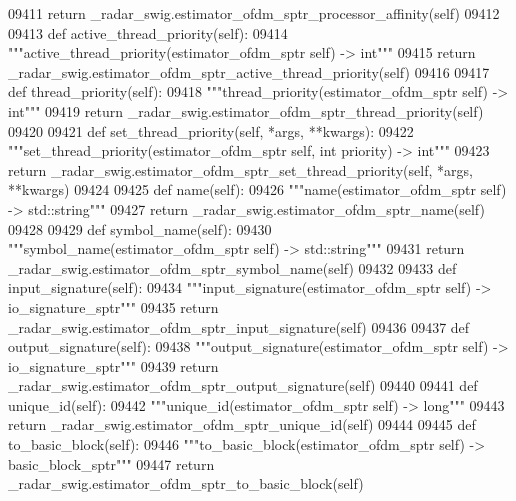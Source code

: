 \begin{DoxyCode}
{{{{{{{{{{{{{{{{{{{{{{{{{{{{{{09411         \textcolor{keywordflow}{return} \_radar\_swig.estimator\_ofdm\_sptr\_processor\_affinity(self)
09412 
09413     \textcolor{keyword}{def }active_thread_priority(self):
09414         \textcolor{stringliteral}{"""active\_thread\_priority(estimator\_ofdm\_sptr self) -> int"""}
09415         \textcolor{keywordflow}{return} \_radar\_swig.estimator\_ofdm\_sptr\_active\_thread\_priority(self)
09416 
09417     \textcolor{keyword}{def }thread_priority(self):
09418         \textcolor{stringliteral}{"""thread\_priority(estimator\_ofdm\_sptr self) -> int"""}
09419         \textcolor{keywordflow}{return} \_radar\_swig.estimator\_ofdm\_sptr\_thread\_priority(self)
09420 
09421     \textcolor{keyword}{def }set_thread_priority(self, *args, **kwargs):
09422         \textcolor{stringliteral}{"""set\_thread\_priority(estimator\_ofdm\_sptr self, int priority) -> int"""}
09423         \textcolor{keywordflow}{return} \_radar\_swig.estimator\_ofdm\_sptr\_set\_thread\_priority(self, *args, **kwargs)
09424 
09425     \textcolor{keyword}{def }name(self):
09426         \textcolor{stringliteral}{"""name(estimator\_ofdm\_sptr self) -> std::string"""}
09427         \textcolor{keywordflow}{return} \_radar\_swig.estimator\_ofdm\_sptr\_name(self)
09428 
09429     \textcolor{keyword}{def }symbol_name(self):
09430         \textcolor{stringliteral}{"""symbol\_name(estimator\_ofdm\_sptr self) -> std::string"""}
09431         \textcolor{keywordflow}{return} \_radar\_swig.estimator\_ofdm\_sptr\_symbol\_name(self)
09432 
09433     \textcolor{keyword}{def }input_signature(self):
09434         \textcolor{stringliteral}{"""input\_signature(estimator\_ofdm\_sptr self) -> io\_signature\_sptr"""}
09435         \textcolor{keywordflow}{return} \_radar\_swig.estimator\_ofdm\_sptr\_input\_signature(self)
09436 
09437     \textcolor{keyword}{def }output_signature(self):
09438         \textcolor{stringliteral}{"""output\_signature(estimator\_ofdm\_sptr self) -> io\_signature\_sptr"""}
09439         \textcolor{keywordflow}{return} \_radar\_swig.estimator\_ofdm\_sptr\_output\_signature(self)
09440 
09441     \textcolor{keyword}{def }unique_id(self):
09442         \textcolor{stringliteral}{"""unique\_id(estimator\_ofdm\_sptr self) -> long"""}
09443         \textcolor{keywordflow}{return} \_radar\_swig.estimator\_ofdm\_sptr\_unique\_id(self)
09444 
09445     \textcolor{keyword}{def }to_basic_block(self):
09446         \textcolor{stringliteral}{"""to\_basic\_block(estimator\_ofdm\_sptr self) -> basic\_block\_sptr"""}
09447         \textcolor{keywordflow}{return} \_radar\_swig.estimator\_ofdm\_sptr\_to\_basic\_block(self)
}}}}}}}}}}}}}}}}}}}}}}}}}}}}}}
\end{DoxyCode}
